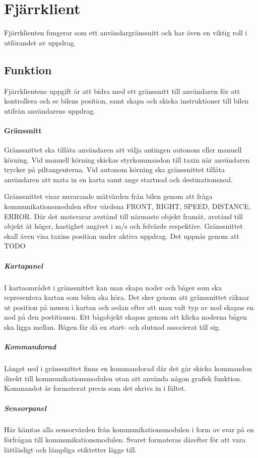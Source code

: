 \documentclass[tekniskrapport/tech.tex]{subfiles}
\begin{document}
\section{Fjärrklient}
Fjärrklienten fungerar som ett användargränssnitt och har även en
viktig roll i utförandet av uppdrag.

\subsection{Funktion}
Fjärrklientens uppgift är att bidra med ett gränssnitt till användaren för att
kontrollera och se bilens position, samt skapa och skicka instruktioner till bilen
utifrån användarens uppdrag.

\paragraph{Gränssnitt}
Gränssnittet ska tillåta användaren att välja antingen autonom eller manuell
körning. Vid manuell körning skickas styrkommandon till taxin när användaren
trycker på piltangenterna. Vid autonom körning ska gränssnittet tillåta
användaren att mata in en karta samt ange startnod och destinationsnod.

Gränssnittet visar nuvarande mätvärden från bilen genom att fråga kommunikationsmodulen efter värdena FRONT, RIGHT, SPEED, DISTANCE, ERROR. Där det motsvarar avstånd till närmaste objekt framåt, avstånd till objekt åt höger, hastighet angivet i m/s och felvärde respektive. 
Gränssnittet skall även visa taxins position under aktiva uppdrag. Det uppnås genom att TODO

\subparagraph{Kartapanel}
I kartaområdet i gränssnittet kan man skapa noder och båger som ska representera kartan som bilen ska köra. Det sker genom att gränssnittet räknar ut position på musen i kartan och sedan efter att man valt typ av nod skapas en nod på den postitionen. Ett bågobjekt skapas genom att klicka noderna bågen ska ligga mellan. Bågen får då en start- och slutnod associerat till sig.

\subparagraph{Kommandorad}
Längst ned i gränssnittet finns en kommandorad där det går skicka kommandon direkt till kommunikationsmodulen utan att använda någon grafisk funktion. Kommandot är formaterat precis som det skrivs in i fältet.

\subparagraph{Sensorpanel}
Här hämtas alla sensorvärden från kommunikationsmodulen i form av svar på en förfrågan till kommunikationsmodulen. Svaret formateras därefter för att vara lättläsligt och lämpliga etiktetter läggs till.
\end{document}

